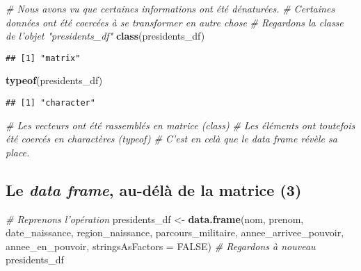 \documentclass[]{book}
\newenvironment{Shaded}{\begin{snugshade}}{\end{snugshade}}
\newcommand{\KeywordTok}[1]{\textcolor[rgb]{0.13,0.29,0.53}{\textbf{#1}}}
\newcommand{\DataTypeTok}[1]{\textcolor[rgb]{0.13,0.29,0.53}{#1}}
\newcommand{\StringTok}[1]{\textcolor[rgb]{0.31,0.60,0.02}{#1}}
\newcommand{\CommentTok}[1]{\textcolor[rgb]{0.56,0.35,0.01}{\textit{#1}}}
\newcommand{\OtherTok}[1]{\textcolor[rgb]{0.56,0.35,0.01}{#1}}
\newcommand{\NormalTok}[1]{#1}
\begin{document}
\tiny

\begin{Shaded}
\begin{Highlighting}[]
\CommentTok{# Nous avons vu que certaines informations ont été dénaturées.}
\CommentTok{# Certaines données ont été coercées à se transformer en autre chose}
\CommentTok{# Regardons la classe de l'objet "presidents_df"}
\KeywordTok{class}\NormalTok{(presidents_df)}
\end{Highlighting}
\end{Shaded}

\begin{verbatim}
## [1] "matrix"
\end{verbatim}

\begin{Shaded}
\begin{Highlighting}[]
\KeywordTok{typeof}\NormalTok{(presidents_df)}
\end{Highlighting}
\end{Shaded}

\begin{verbatim}
## [1] "character"
\end{verbatim}

\begin{Shaded}
\begin{Highlighting}[]
\CommentTok{# Les vecteurs ont été rassemblés en matrice (class)}
\CommentTok{# Les éléments ont toutefois été coercés en charactères (typeof)}
\CommentTok{# C'est en celà que le data frame révèle sa place.}
\end{Highlighting}
\end{Shaded}

\normalsize

\subsection{\texorpdfstring{Le \emph{data frame}, au-délà de la matrice
(3)}{Le data frame, au-délà de la matrice (3)}}\label{le-data-frame-au-dela-de-la-matrice-3}

\tiny

\begin{Shaded}
\begin{Highlighting}[]
\CommentTok{# Reprenons l'opération}
\NormalTok{presidents_df <-}\StringTok{ }\KeywordTok{data.frame}\NormalTok{(nom,}
\NormalTok{                            prenom, }
\NormalTok{                            date_naissance, }
\NormalTok{                            region_naissance, }
\NormalTok{                            parcours_militaire, }
\NormalTok{                            annee_arrivee_pouvoir, }
\NormalTok{                            annee_en_pouvoir,}
                            \DataTypeTok{stringsAsFactors =} \OtherTok{FALSE}\NormalTok{)}
\CommentTok{# Regardons à nouveau}
\NormalTok{presidents_df}
\end{Highlighting}
\end{Shaded}
\end{document}
